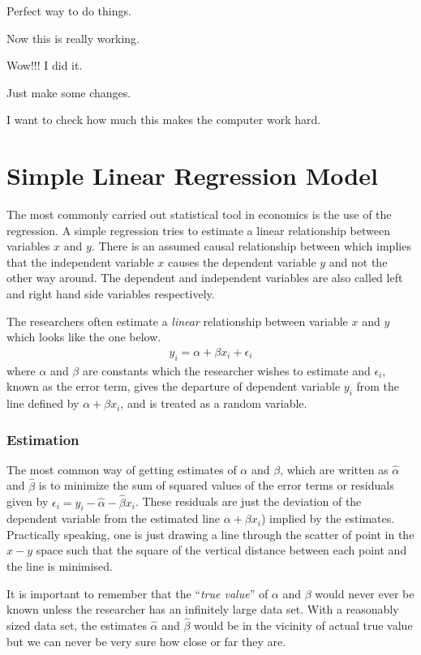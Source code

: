 \documentclass[12pt,onesided]{article}
\begin{document}
Perfect way to do things.

Now this is really working.

Wow!!! I did it.

Just make some changes.

I want to check how much this makes the computer work hard.



\section{Simple Linear Regression Model}

The most commonly carried out statistical tool in economics is the use of the regression. A simple regression tries to estimate a
linear relationship between variables $x$ and $y$. There is an
assumed causal relationship between which implies that the
independent variable $x$ causes the dependent variable $y$ and not
the other way around. The dependent and independent variables are
also called left and right hand side variables respectively.

The researchers often estimate a \emph{linear} relationship between
variable $x$ and $y$ which looks like the one below.
\begin{align*}
    y_i= \alpha + \beta x_i + \epsilon_i
\end{align*}
where $\alpha$ and $\beta$ are constants which the researcher wishes
to estimate and $\epsilon_i$, known as the error term, gives the
departure of dependent variable $y_i$ from the line defined by
$\alpha + \beta x_i$, and is treated as a random variable.

\subsubsection*{Estimation}

The most common way of getting estimates of $\alpha$ and $\beta$, which are written as $\hat{\alpha}$ and $\hat{\beta}$ is to minimize the sum of squared values of the error terms or residuals given by $\epsilon_i=y_i-\hat{\alpha}-\hat{\beta}x_i$. These residuals are just the deviation of the dependent variable from the estimated line $\alpha + \beta x_i$) implied by the estimates. Practically speaking, one is just drawing a line through the scatter of point in the $x-y$ space such that the square of the vertical distance between each point and the line is minimised.

It is important to remember that the ``\emph{true value}'' of
$\alpha$ and $\beta$ would never ever be known unless the researcher
has an infinitely large data set. With a reasonably sized data set,
the estimates $\hat{\alpha}$ and $\hat{\beta}$ would be in the
vicinity of actual true value but we can never be very sure how
close or far they are.
\end{document}
